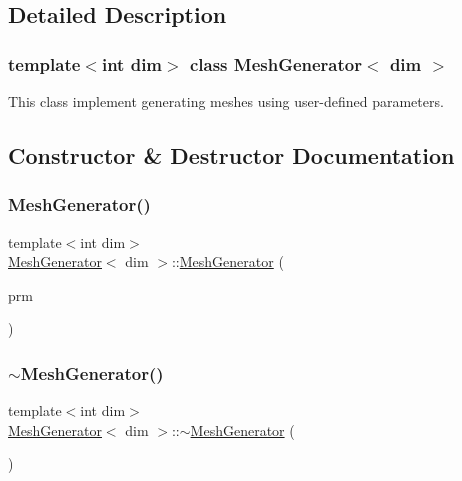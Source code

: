 \subsection{Detailed Description}
\subsubsection*{template$<$int dim$>$\newline
class Mesh\+Generator$<$ dim $>$}

This class implement generating meshes using user-\/defined parameters. 

\subsection{Constructor \& Destructor Documentation}
\mbox{\label{class_mesh_generator_aaf711e4f4d1702dd2f91b8dc3d425765}} 
\subsubsection{\texorpdfstring{Mesh\+Generator()}{MeshGenerator()}}
{\footnotesize\ttfamily template$<$int dim$>$ \\
\hyperlink{class_mesh_generator}{Mesh\+Generator}$<$ dim $>$\+::\hyperlink{class_mesh_generator}{Mesh\+Generator} (\begin{DoxyParamCaption}\item[{Parameter\+Handler \&}]{prm }\end{DoxyParamCaption})}

\mbox{\label{class_mesh_generator_aa8a590f00d9732424e56f54bcc2b6339}} 
\subsubsection{\texorpdfstring{$\sim$\+Mesh\+Generator()}{~MeshGenerator()}}
{\footnotesize\ttfamily template$<$int dim$>$ \\
\hyperlink{class_mesh_generator}{Mesh\+Generator}$<$ dim $>$\+::$\sim$\hyperlink{class_mesh_generator}{Mesh\+Generator} (\begin{DoxyParamCaption}{ }\end{DoxyParamCaption})}



